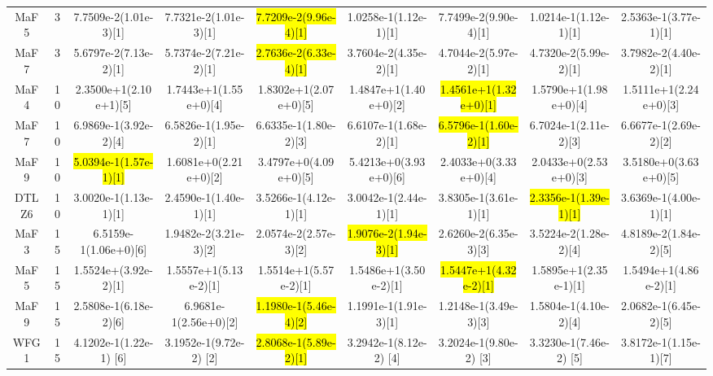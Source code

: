 \documentclass[a4paper,fleqn]{cas-dc}
\newcommand{\highlight}[1]{
	\begingroup
	\sethlcolor{Seashell}%
	\hl{#1}%
	\endgroup
}
\begin{document}
\begin{sloppypar}
\begin{table}[ht]
{\begin{tabular}{ccccccccc}
				MaF5 &3 &7.7509e-2(1.01e-3)[1]	&7.7321e-2(1.01e-3)[1]	&\highlight{7.7209e-2(9.96e-4)[1]}	&1.0258e-1(1.12e-1)[1]	&7.7499e-2(9.90e-4)[1]	&1.0214e-1(1.12e-1)[1]	&2.5363e-1(3.77e-1)[1]\\   
				
				MaF7 &3 &5.6797e-2(7.13e-2)[1]	&5.7374e-2(7.21e-2)[1]	&\highlight{2.7636e-2(6.33e-4)[1]}	&3.7604e-2(4.35e-2)[1]	&4.7044e-2(5.97e-2)[1]	&4.7320e-2(5.99e-2)[1]	&3.7982e-2(4.40e-2)[1]\\   
				
				MaF4 &10  &2.3500e+1(2.10e+1)[5]	&1.7443e+1(1.55e+0)[4]	&1.8302e+1(2.07e+0)[5]	&1.4847e+1(1.40e+0)[2]	&\highlight{1.4561e+1(1.32e+0)[1]}	&1.5790e+1(1.98e+0)[4]	&1.5111e+1(2.24e+0)[3]\\ 
				
				MaF7 &10 &6.9869e-1(3.92e-2)[4]	&6.5826e-1(1.95e-2)[1]	&6.6335e-1(1.80e-2)[3]	&6.6107e-1(1.68e-2)[1]	&\highlight{6.5796e-1(1.60e-2)[1]}	&6.7024e-1(2.11e-2)[3]	&6.6677e-1(2.69e-2)[2]\\  
				
				MaF9 &10  &\highlight{5.0394e-1(1.57e-1)[1]}	&1.6081e+0(2.21e+0)[2]	&3.4797e+0(4.09e+0)[5]	&5.4213e+0(3.93e+0)[6]	&2.4033e+0(3.33e+0)[4]	&2.0433e+0(2.53e+0)[3]	&3.5180e+0(3.63e+0)[5]\\
				
				DTLZ6 &10 &3.0020e-1(1.13e-1)[1]	&2.4590e-1(1.40e-1)[1]	&3.5266e-1(4.12e-1)[1]	&3.0042e-1(2.44e-1)[1]	&3.8305e-1(3.61e-1)[1]	&\highlight{2.3356e-1(1.39e-1)[1]}	&3.6369e-1(4.00e-1)[1]\\  
				
				MaF3 &15 &6.5159e-1(1.06e+0)[6]	&1.9482e-2(3.21e-3)[2]	&2.0574e-2(2.57e-3)[2]	&\highlight{1.9076e-2(1.94e-3)[1]}	&2.6260e-2(6.35e-3)[3]	&3.5224e-2(1.28e-2)[4]	&4.8189e-2(1.84e-2)[5]\\  
				
				MaF5 &15 &1.5524e+(3.92e-2)[1]	&1.5557e+1(5.13e-2)[1]	&1.5514e+1(5.57e-2)[1]	&1.5486e+1(3.50e-2)[1]	&\highlight{1.5447e+1(4.32e-2)[1]}	&1.5895e+1(2.35e-1)[1]	&1.5494e+1(4.86e-2)[1]\\  
				
				MaF9 &15  &2.5808e-1(6.18e-2)[6]	&6.9681e-1(2.56e+0)[2]	&\highlight{1.1980e-1(5.46e-4)[2]}	&1.1991e-1(1.91e-3)[1]	&1.2148e-1(3.49e-3)[3]	&1.5804e-1(4.10e-2)[4]	&2.0682e-1(6.45e-2)[5]\\  
				
				WFG1 &15 &4.1202e-1(1.22e-1) [6]	&3.1952e-1(9.72e-2) [2]	&\highlight{2.8068e-1(5.89e-2)[1]}	&3.2942e-1(8.12e-2) [4]	&3.2024e-1(9.80e-2) [3]	&3.3230e-1(7.46e-2) [5]	&3.8172e-1(1.15e-1)[7]\\  
				

\end{tabular}}
\end{table}
\end{sloppypar}
\end{document}

